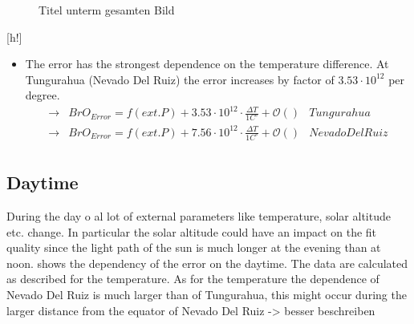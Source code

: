 \documentclass  [
  paper    = a4,
  BCOR     = 10mm,
  twoside,
  fontsize = 12pt,
  fleqn,
  toc      = bibnumbered,
  toc      = listofnumbered,
  numbers  = noendperiod,
  headings = normal,
  listof   = leveldown,
  version  = 3.03
]                                       {scrreprt}
\begin{document}
	\begin{figure}[h!]			
		\caption{Titel unterm gesamten Bild}
		\label{fig:difftemp}
	\end{figure}[h!]
	\begin{itemize}
		\item The  error has the strongest dependence on the temperature difference. At Tungurahua (Nevado Del Ruiz) the  error increases by factor of $3.53\cdot10^{12}$  per degree.
		\begin{align*}
		\rightarrow&  BrO_{Error} = f(ext. P)+ 3.53\cdot10^{12}\cdot\frac{\Delta T}{1C^{\circ}} + \mathcal{O}\left(\right) & Tungurahua\\
		\rightarrow&  BrO_{Error} = f(ext. P)+7.56\cdot10^{12}\cdot\frac{\Delta T}{1C^{\circ}} + \mathcal{O}\left(\right) & Nevado Del Ruiz\\
		\end{align*}
	\end{itemize}
	\subsection{Daytime}
	During the day o al lot of external parameters like temperature, solar altitude etc. change. In particular the solar altitude could have an impact on the fit quality since the light path of the sun is much longer at the evening than at noon.  shows the dependency of the  error on the daytime. The data are calculated as described for the temperature. As for the temperature the dependence of Nevado Del Ruiz is much larger than of Tungurahua, this might occur during the larger distance from the equator of Nevado Del Ruiz -> besser beschreiben
\end{document}
